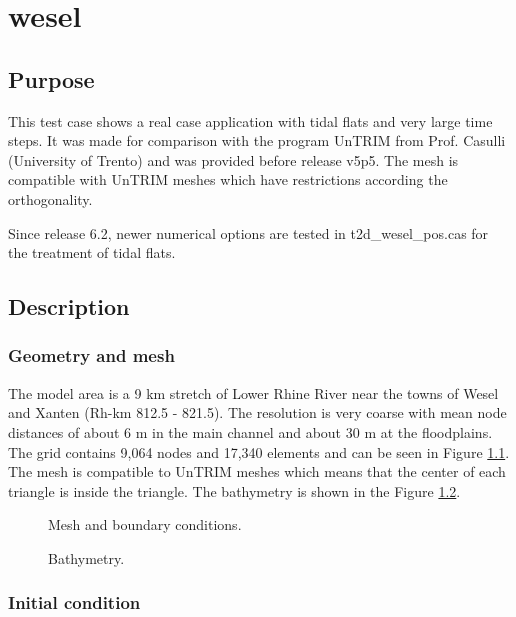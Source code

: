 \chapter{wesel}

\section{Purpose}
This test case shows a real case application
with tidal flats and very large time steps.
It was made for comparison with the program UnTRIM
from Prof. Casulli (University of Trento)
and was provided before release v5p5.
The mesh is compatible with UnTRIM meshes which have restrictions according the
orthogonality.

Since release 6.2, newer numerical options are tested in t2d\_wesel\_pos.cas
for the treatment of tidal flats. 

\section{Description}

\subsection{Geometry and mesh}
The model area is a 9 km stretch of Lower Rhine River near the towns of Wesel
and Xanten (Rh-km 812.5 - 821.5).
The resolution is very coarse with mean node distances of about 6 m in the main
channel and about 30 m at the floodplains.
The grid contains 9,064 nodes and 17,340 elements and can be seen in Figure
\ref{t2d:wesel:mesh}.
The mesh is compatible to UnTRIM meshes which means that the center of each
triangle is inside the triangle.
The bathymetry is shown in the Figure \ref{t2d:wesel:Bathy}.

\begin{figure}[h!]
\centering
{}
\caption{Mesh and boundary conditions.}
\label{t2d:wesel:mesh}
\end{figure}


\begin{figure} [h!]
\centering
{}
\caption{Bathymetry.}
\label{t2d:wesel:Bathy}
\end{figure}


\subsection{Initial condition}

